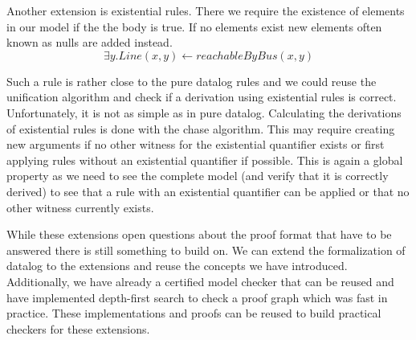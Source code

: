 Another extension is existential rules. There we require the existence of elements in our model if the the body is true. If no elements exist new elements often known as nulls are added instead.
\[ \exists y. Line(x,y) \leftarrow reachableByBus(x,y)\]

Such a rule is rather close to the pure datalog rules and we could reuse the unification algorithm and check if a derivation using existential rules is correct. Unfortunately, it is not as simple as in pure datalog. Calculating the derivations of existential rules is done with the chase algorithm. This may require creating new arguments if no other witness for the existential quantifier exists or first applying rules without an existential quantifier if possible. This is again a global property as we need to see the complete model (and verify that it is correctly derived) to see that a rule with an existential quantifier can be applied or that no other witness currently exists.

While these extensions open questions about the proof format that have to be answered there is still something to build on. We can extend the formalization of datalog to the extensions and reuse the concepts we have introduced. Additionally, we have already a certified model checker that can be reused and have implemented depth-first search to check a proof graph which was fast in practice. These implementations and proofs can be reused to build practical checkers for these extensions.


